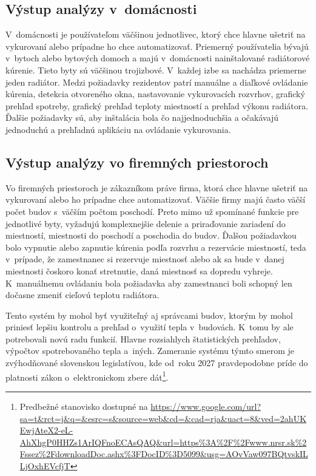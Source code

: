 \subsection{Výstup analýzy v~domácnosti}\label{analyza-user-home}
V~domácnosti je používateľom väčšinou jednotlivec, ktorý chce hlavne ušetriť na vykurovaní alebo prípadne ho chce automatizovať. 
Priemerný používatelia bývajú v~bytoch alebo bytových domoch a majú v~domácnosti nainštalované radiátorové kúrenie. Tieto byty sú väčšinou trojizbové. 
V~každej izbe sa nachádza priemerne jeden radiátor. 
Medzi požiadavky rezidentov patrí manuálne a diaľkové ovládanie kúrenia, detekcia otvoreného okna, nastavovanie vykurovacích rozvrhov, grafický prehľad spotreby, grafický prehľad teploty miestností a prehľad výkonu radiátora. 
Ďalšie požiadavky sú, aby inštalácia bola čo najjednoduchšia a očakávajú jednoduchú a prehľadnú aplikáciu na ovládanie vykurovania. 

\subsection{Výstup analýzy vo firemných priestoroch}\label{analyza-user-bussiness}
Vo firemných priestoroch je zákazníkom práve firma, ktorá chce hlavne ušetriť na vykurovaní alebo ho prípadne chce automatizovať.
Väčšie firmy majú často väčší počet budov s~väčším počtom poschodí.
Preto mimo už spomínané funkcie pre jednotlivé byty, vyžadujú komplexnejšie delenie a priraďovanie zariadení do miestností, miestnosti do poschodí a poschodia do budov. 
Ďalšou požiadavkou bolo vypnutie alebo zapnutie kúrenia podľa rozvrhu a rezervácie miestností, teda v~prípade, že zamestnanec si rezervuje miestnosť alebo ak sa bude v~danej miestnosti čoskoro konať stretnutie, daná miestnosť sa dopredu vyhreje.
K~manuálnemu ovládaniu bola požiadavka aby zamestnanci boli schopný len dočasne zmeniť cieľovú teplotu radiátora. 

Tento systém by mohol byť využiteľný aj správcami budov, ktorým by mohol priniesť lepšiu kontrolu a prehľad o~využití tepla v~budovách. K~tomu by ale potrebovali novú radu funkcií. Hlavne rozsiahlych štatistických prehľadov, výpočtov spotrebovaného tepla a~iných. Zameranie systému týmto smerom je zvýhodňované slovenskou legislatívou, kde od~roku 2027 pravdepodobne príde do platnosti zákon o~elektronickom zbere dát\footnote{Predbežné stanovisko dostupné na \url{https://www.google.com/url?sa=t&rct=j&q=&esrc=s&source=web&cd=&cad=rja&uact=8&ved=2ahUKEwjAteX2-eL-AhXhgP0HHZs1ArIQFnoECAsQAQ&url=https\%3A\%2F\%2Fwww.nrsr.sk\%2Fssez\%2FdownloadDoc.ashx\%3FDocID\%3D5099&usg=AOvVaw097BQtvskILLjOxhEVcfjT}}.

